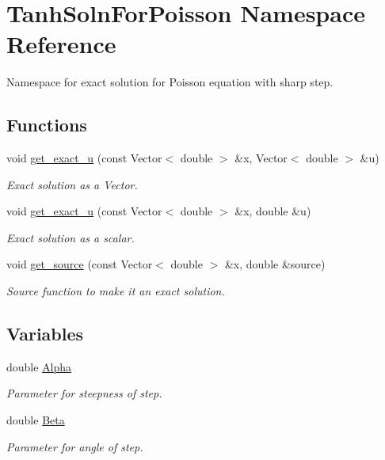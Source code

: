 \hypertarget{namespaceTanhSolnForPoisson}{}\section{Tanh\+Soln\+For\+Poisson Namespace Reference}
\label{namespaceTanhSolnForPoisson}


Namespace for exact solution for Poisson equation with sharp step.  


\subsection*{Functions}
\begin{DoxyCompactItemize}
\item 
void \hyperlink{namespaceTanhSolnForPoisson_af7896e9c18ce6438c73ae2a875e8b7de}{get\+\_\+exact\+\_\+u} (const Vector$<$ double $>$ \&x, Vector$<$ double $>$ \&u)
\begin{DoxyCompactList}\small\item\em Exact solution as a Vector. \end{DoxyCompactList}\item 
void \hyperlink{namespaceTanhSolnForPoisson_af197decab980d38d2037032780723984}{get\+\_\+exact\+\_\+u} (const Vector$<$ double $>$ \&x, double \&u)
\begin{DoxyCompactList}\small\item\em Exact solution as a scalar. \end{DoxyCompactList}\item 
void \hyperlink{namespaceTanhSolnForPoisson_ae1b9d6789ff301e3d63a4e292213036c}{get\+\_\+source} (const Vector$<$ double $>$ \&x, double \&source)
\begin{DoxyCompactList}\small\item\em Source function to make it an exact solution. \end{DoxyCompactList}\end{DoxyCompactItemize}
\subsection*{Variables}
\begin{DoxyCompactItemize}
\item 
double \hyperlink{namespaceTanhSolnForPoisson_ae676ccd186d5df119cce811596d949c1}{Alpha}
\begin{DoxyCompactList}\small\item\em Parameter for steepness of step. \end{DoxyCompactList}\item 
double \hyperlink{namespaceTanhSolnForPoisson_ae07364a1d73b28e5e250bda6c8954f01}{Beta}
\begin{DoxyCompactList}\small\item\em Parameter for angle of step. \end{DoxyCompactList}\end{DoxyCompactItemize}


